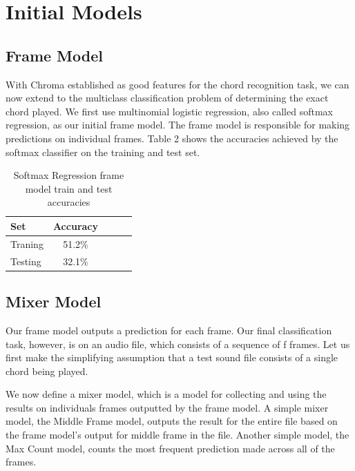 \documentclass{article}
\begin{document}
\section{Initial Models}
\subsection{Frame Model}
With Chroma established as good features for the chord recognition task, we can
now extend to the multiclass classification problem of determining the exact
chord played. We first use multinomial logistic regression, also called softmax
regression, as our initial frame model. The frame model is responsible for
making predictions on individual frames. Table 2 shows the accuracies achieved
by the softmax classifier on the training and test set.
\begin{table}[t]
\caption{Softmax Regression frame model train and test accuracies}
\label{softmax}
\vskip 0.15in
\begin{center}
\begin{small}
\begin{sc}
\begin{tabular}{lcccr}
\hline
\abovespace\belowspace
Set & Accuracy \\
\hline
\abovespace
Traning & 51.2\%\\
Testing & 32.1\%\\
\hline
\end{tabular}
\end{sc}
\end{small}
\end{center}
\vskip -0.1in
\end{table}

\subsection{Mixer Model}
Our frame model outputs a prediction for each frame. Our final classification
task, however, is on an audio file, which consists of a sequence of f frames.
Let us first make the simplifying assumption that a test sound file consists of
a single chord being played.

We now define a mixer model, which is a model for collecting and using the
results on individuals frames outputted by the frame model. A simple mixer
model, the Middle Frame model, outputs the result for the entire file based on
the frame model's output for middle frame in the file. Another simple model, the
Max Count model, counts the most frequent prediction made across all of the
frames.
\end{document}
